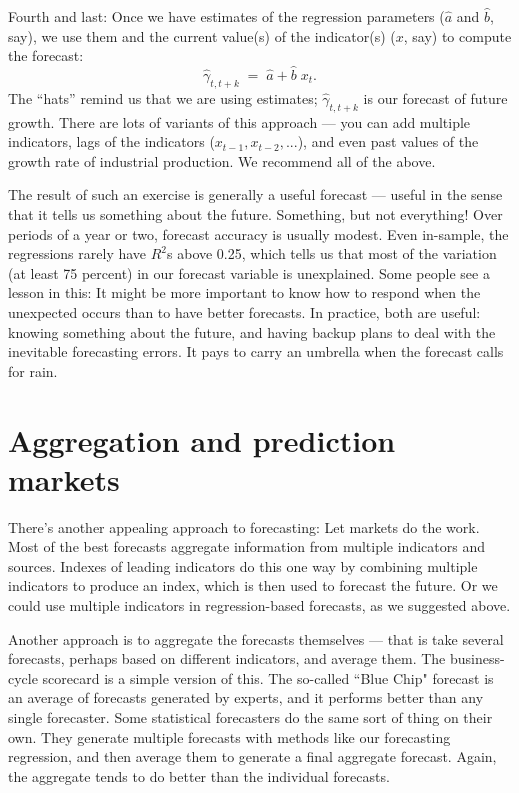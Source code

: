 Fourth and last:
Once we have estimates of the regression
parameters ($\widehat{a}$ and $\widehat{b}$, say),
we use them and the current value(s)
of the indicator(s) ($x$, say)
to compute the forecast:
\[
        \widehat{\gamma}_{t,t+k}  \;=\;  \widehat{a} + \widehat{b} \; x_t .
\]
The ``hats'' remind us that we are using estimates;
$\widehat{\gamma}_{t,t+k}$ is our forecast of future growth.
There are lots of variants of this approach --- you can add multiple indicators,
lags of the indicators  ($x_{t-1}, x_{t-2}, ...$),
and even past values of the growth rate of industrial
production.
We recommend all of the above.


The result of such an exercise is generally a useful forecast --- useful in the sense that it tells us something about the future.
Something, but not everything!
Over periods of a year or two, forecast accuracy is usually modest.
Even in-sample, the regressions rarely have $R^2$s above 0.25,
which tells us that most of the variation (at least 75 percent) in our forecast variable is unexplained.
Some people see a lesson in this:  It might be more important
to know how to respond when the unexpected occurs
than to have better forecasts.
In practice, both are useful:  knowing something about the future,
and having backup plans to deal with the inevitable forecasting errors. It pays to carry an umbrella when the forecast calls for rain.


\section{Aggregation and prediction markets}

There's another appealing approach to forecasting: Let markets do the work.
Most of the best forecasts aggregate information from multiple
indicators and sources.
Indexes of leading indicators do this one way by combining multiple indicators to produce an index, which is then used
to forecast the future.
Or we could use multiple indicators in regression-based forecasts,
as we suggested above.

Another approach is to aggregate the forecasts themselves --- that is take several forecasts, perhaps based on different indicators, and average them.
The business-cycle scorecard 
 is a simple version of this.
The so-called ``Blue Chip" forecast is an average of forecasts generated by experts, and it performs better than any single forecaster.
Some statistical forecasters do the same sort of thing on their own.
They generate multiple forecasts with methods like our forecasting regression, and then average them to generate a final aggregate forecast. Again,
the aggregate tends to do better than the individual forecasts.

